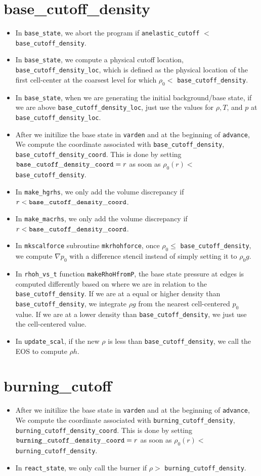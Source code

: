\documentclass[11pt]{article}
\begin{document}
\section{base\_cutoff\_density}
\begin{itemize}
\item In {\tt base\_state}, we abort the program if {\tt anelastic\_cutoff} $<$ {\tt base\_cutoff\_density}.
\item In {\tt base\_state}, we compute a physical cutoff location, {\tt base\_cutoff\_density\_loc}, which is defined as the physical location of the first cell-center at the coarsest level for which $\rho_0 <$ {\tt base\_cutoff\_density}.
\item In {\tt base\_state}, when we are generating the initial background/base state, if we are above {\tt base\_cutoff\_density\_loc}, just use the values for $\rho,T$, and $p$ at {\tt base\_cutoff\_density\_loc}.
\item After we initilize the base state in {\tt varden} and at the beginning of {\tt advance}, We compute the coordinate associated with {\tt base\_cutoff\_density}, {\tt base\_cutoff\_density\_coord}.  This is done by setting ${\tt base\_cutoff\_density\_coord}= r$ as soon as $\rho_0(r) <$ {\tt base\_cutoff\_density}.
\item In {\tt make\_hgrhs}, we only add the volume discrepancy if $r < {\tt base\_cutoff\_density\_coord}$.
\item In {\tt make\_macrhs}, we only add the volume discrepancy if $r < {\tt base\_cutoff\_density\_coord}$.
\item In {\tt mkscalforce} subroutine {\tt mkrhohforce}, once $\rho_0 \le$ {\tt base\_cutoff\_density}, we compute $\nabla p_0$ with a difference stencil instead of simply setting it to $\rho_0 g$.
\item In {\tt rhoh\_vs\_t} function {\tt makeRhoHfromP}, the base state pressure at edges is computed differently based on where we are in relation to the {\tt base\_cutoff\_density}.  If we are at a equal or higher density than {\tt base\_cutoff\_density}, we integrate $\rho g$ from the nearest cell-centered $p_0$ value.  If we are at a lower density than {\tt base\_cutoff\_density}, we just use the cell-centered value.
\item In {\tt update\_scal}, if the new $\rho$ is less than {\tt base\_cutoff\_density}, we call the EOS to compute $\rho h$.
\end{itemize}
\section{burning\_cutoff}
\begin{itemize}
\item After we initilize the base state in {\tt varden} and at the beginning of {\tt advance}, We compute the coordinate associated with {\tt burning\_cutoff\_density}, {\tt burning\_cutoff\_density\_coord}.  This is done by setting ${\tt burning\_cutoff\_density\_coord}= r$ as soon as $\rho_0(r) <$ {\tt burning\_cutoff\_density}.
\item In {\tt react\_state}, we only call the burner if $\rho >$ {\tt burning\_cutoff\_density}.
\end{itemize}
\end{document}
